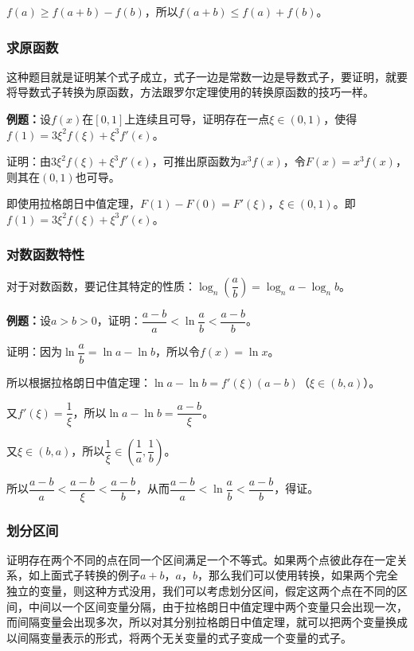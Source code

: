 $f(a)\geqslant f(a+b)-f(b)$，所以$f(a+b)\leqslant f(a)+f(b)$。

\subsubsection{求原函数}

这种题目就是证明某个式子成立，式子一边是常数一边是导数式子，要证明，就要将导数式子转换为原函数，方法跟罗尔定理使用的转换原函数的技巧一样。

\textbf{例题：}设$f(x)$在$[0,1]$上连续且可导，证明存在一点$\xi\in(0,1)$，使得$f(1)=3\xi^2f(\xi)+\xi^3f'(\epsilon)$。

证明：由$3\xi^2f(\xi)+\xi^3f'(\epsilon)$，可推出原函数为$x^3f(x)$，令$F(x)=x^3f(x)$，则其在$(0,1)$也可导。

即使用拉格朗日中值定理，$F(1)-F(0)=F'(\xi)$，$\xi\in(0,1)$。即$f(1)=3\xi^2f(\xi)+\xi^3f'(\epsilon)$。

\subsubsection{对数函数特性}

对于对数函数，要记住其特定的性质：$\log_n(\dfrac{a}{b})=\log_na-\log_nb$。

\textbf{例题：}设$a>b>0$，证明：$\dfrac{a-b}{a}<\ln\dfrac{a}{b}<\dfrac{a-b}{b}$。

证明：因为$\ln\dfrac{a}{b}=\ln a-\ln b$，所以令$f(x)=\ln x$。

所以根据拉格朗日中值定理：$\ln a-\ln b=f'(\xi)(a-b)$（$\xi\in(b,a)$）。

又$f'(\xi)=\dfrac{1}{\xi}$，所以$\ln a-\ln b=\dfrac{a-b}{\xi}$。

又$\xi\in(b,a)$，所以$\dfrac{1}{\xi}\in(\dfrac{1}{a},\dfrac{1}{b})$。

所以$\dfrac{a-b}{a}<\dfrac{a-b}{\xi}<\dfrac{a-b}{b}$，从而$\dfrac{a-b}{a}<\ln\dfrac{a}{b}<\dfrac{a-b}{b}$，得证。

\subsubsection{划分区间}

证明存在两个不同的点在同一个区间满足一个不等式。如果两个点彼此存在一定关系，如上面式子转换的例子$a+b$，$a$，$b$，那么我们可以使用转换，如果两个完全独立的变量，则这种方式没用，我们可以考虑划分区间，假定这两个点在不同的区间，中间以一个区间变量分隔，由于拉格朗日中值定理中两个变量只会出现一次，而间隔变量会出现多次，所以对其分别拉格朗日中值定理，就可以把两个变量换成以间隔变量表示的形式，将两个无关变量的式子变成一个变量的式子。

